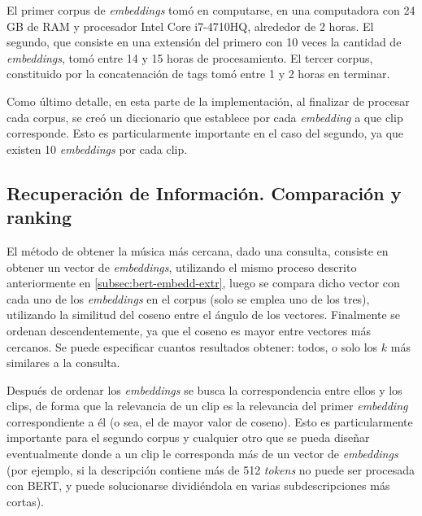 El primer corpus de \textit{embeddings} tomó en computarse, en una computadora con 24 GB de RAM y procesador Intel Core i7-4710HQ, alrededor de 2 horas. El segundo, que consiste en una extensión del primero con 10 veces la cantidad de \textit{embeddings}, tomó entre 14 y 15 horas de procesamiento. El tercer corpus, constituido por la concatenación de tags tomó entre 1 y 2 horas en terminar.

Como último detalle, en esta parte de la implementación, al finalizar de procesar cada corpus, se creó un diccionario que establece por cada \textit{embedding} a que clip corresponde. Esto es particularmente importante en el caso del segundo, ya que existen 10 \textit{embeddings} por cada clip.

\subsection{Recuperación de Información. Comparación y ranking}
\label{subsec:IR-process-query}

El método de obtener la música más cercana, dado una consulta, consiste en obtener un vector de \textit{embeddings}, utilizando el mismo proceso descrito anteriormente en  \ref{subsec:bert-embedd-extr}, luego se compara dicho vector con cada uno de los \textit{embeddings} en el corpus (solo se emplea uno de los tres), utilizando la similitud del coseno entre el ángulo de los vectores. Finalmente se ordenan descendentemente, ya que el coseno es mayor entre vectores más cercanos. Se puede especificar cuantos resultados obtener: todos, o solo los $k$ más similares a la consulta. 

Después de ordenar los \textit{embeddings} se busca la correspondencia entre ellos y los clips, de forma que la relevancia de un clip es la relevancia del primer \textit{embedding} correspondiente a él (o sea, el de mayor valor de coseno). Esto es particularmente importante para el segundo corpus y cualquier otro que se pueda diseñar eventualmente donde a un clip le corresponda más de un vector de \textit{embeddings} (por ejemplo, si la descripción contiene más de 512 \textit{tokens} no puede ser procesada con BERT, y puede solucionarse dividiéndola en varias subdescripciones más cortas).

